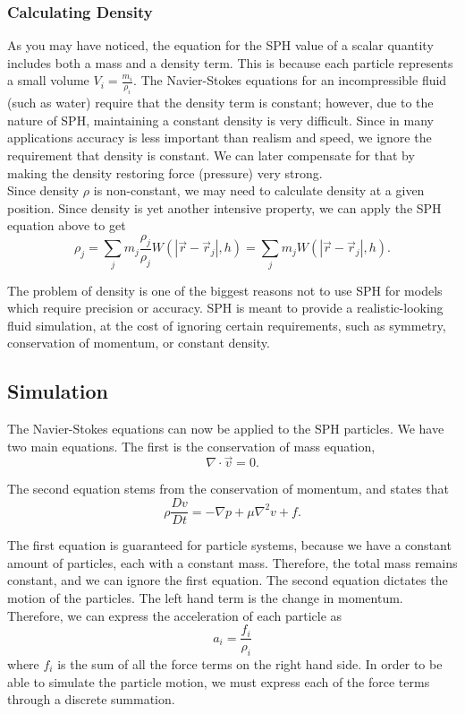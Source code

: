 \documentclass[a4paper,twocolumn]{article}
\begin{document}
\subsubsection{Calculating Density}
As you may have noticed, the equation for the SPH value of a scalar quantity includes both a mass and a density term. This is because each particle represents a small volume $V_i = \frac{m_i}{\rho_i}$. The Navier-Stokes equations for an incompressible fluid (such as water) require that the density term is constant; however, due to the nature of SPH, maintaining a constant density is very difficult. Since in many applications accuracy is less important than realism and speed, we ignore the requirement that density is constant. We can later compensate for that by making the density restoring force (pressure) very strong. \\


Since density $\rho$ is non-constant, we may need to calculate density at a given position. Since density is yet another intensive property, we can apply the SPH equation above to get
\[\rho_j = \sum_j m_j \frac{\rho_j}{\rho_j} W(|\vec r - \vec r_j|, h) = \sum_j m_j W(|\vec r - \vec r_j|, h).\]

The problem of density is one of the biggest reasons not to use SPH for models which require precision or accuracy. SPH is meant to provide a realistic-looking fluid simulation, at the cost of ignoring certain requirements, such as symmetry, conservation of momentum, or constant density.

\subsection{Simulation}
The Navier-Stokes equations can now be applied to the SPH particles. We have two main equations. The first is the conservation of mass equation, 
\[\nabla\cdot\vec v = 0.\]


The second equation stems from the conservation of momentum, and states that 
\[\rho\frac{Dv}{Dt} = -\nabla p + \mu \nabla^2 v + f.\]

The first equation is guaranteed for particle systems, because we have a constant amount of particles, each with a constant mass. Therefore, the total mass remains constant, and we can ignore the first equation. The second equation dictates the motion of the particles. The left hand term is the change in momentum. Therefore, we can express the acceleration of each particle as
\[a_i = \frac{f_i}{\rho_i}\]
where $f_i$ is the sum of all the force terms on the right hand side. In order to be able to simulate the particle motion, we must express each of the force terms through a discrete summation.
\end{document}
